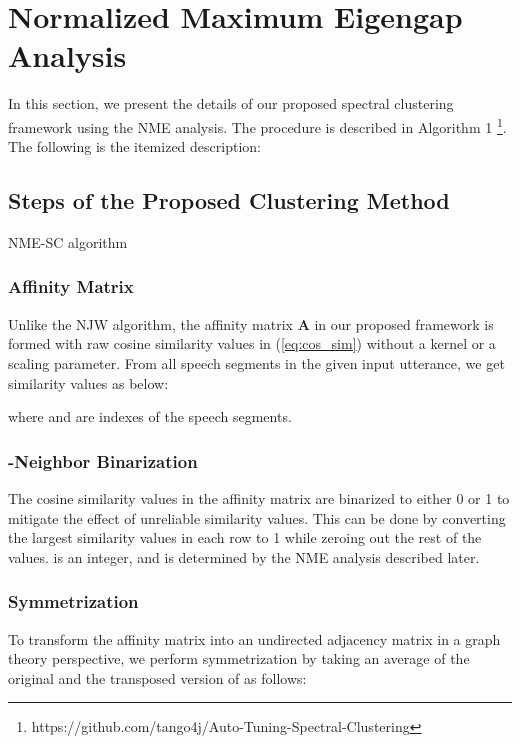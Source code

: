 \documentclass[journal]{IEEEtran}
\begin{document}
\section{Normalized Maximum Eigengap Analysis} 
In this section, we present the details of our proposed spectral clustering framework using the NME analysis. The procedure is described in Algorithm 1 \footnote{https://github.com/tango4j/Auto-Tuning-Spectral-Clustering}. The following is the itemized description:
\subsection{Steps of the Proposed Clustering Method}
\setlength{\textfloatsep}{5pt}
\begin{algorithm}[t]
\small
\caption{NME-SC algorithm}
\label{alg:loop}
\begin{algorithmic}[1ht]
\vspace{0.5ex}
        \State {}
        \State {}
        \State {}
        \State {}
        \State {}
        \State {}
        \State {}
    \EndFor
    \State {}
    \State {}
    \State {}
    \State {}
    \State \Return {}
\EndProcedure
\end{algorithmic}
\end{algorithm}

\subsubsection{Affinity Matrix} Unlike the NJW algorithm, the affinity matrix \textbf{A} in our proposed framework is formed with raw cosine similarity values in (\ref{eq:cos_sim}) without a kernel or a scaling parameter. From all  speech segments in the given input utterance, we get  similarity values as below:
  
  where  and  are indexes of the speech segments.
  \subsubsection{-Neighbor Binarization} The cosine similarity values in the affinity matrix  are binarized to either 0 or 1 to mitigate the effect of unreliable similarity values. This can be done by converting the  largest similarity values in each row to 1 while zeroing out the rest of the values.  is an integer, and is determined by the NME analysis described later.

  \subsubsection{Symmetrization} To transform the affinity matrix  into an undirected adjacency matrix in a graph theory perspective, we perform symmetrization by taking an average of the original and the transposed version of  as follows: 
  
\end{document}
